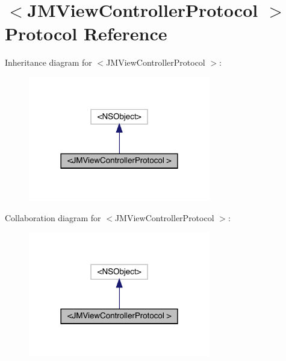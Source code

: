 \hypertarget{protocol_j_m_view_controller_protocol_01-p}{}\section{$<$J\+M\+View\+Controller\+Protocol $>$ Protocol Reference}
\label{protocol_j_m_view_controller_protocol_01-p}


Inheritance diagram for $<$J\+M\+View\+Controller\+Protocol $>$\+:\nopagebreak
\begin{figure}[H]
\begin{center}
\leavevmode
\includegraphics[width=225pt]{protocol_j_m_view_controller_protocol_01-p__inherit__graph}
\end{center}
\end{figure}


Collaboration diagram for $<$J\+M\+View\+Controller\+Protocol $>$\+:\nopagebreak
\begin{figure}[H]
\begin{center}
\leavevmode
\includegraphics[width=225pt]{protocol_j_m_view_controller_protocol_01-p__coll__graph}
\end{center}
\end{figure}
